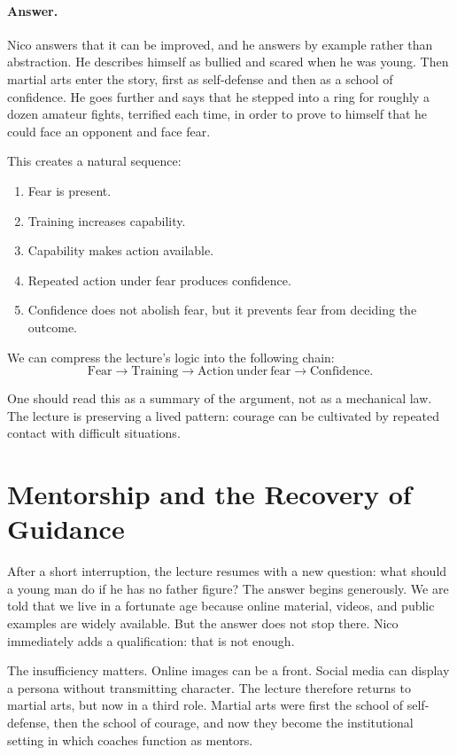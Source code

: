\paragraph{Answer.} Nico answers that it can be improved, and he answers by example rather than abstraction. He describes himself as bullied and scared when he was young. Then martial arts enter the story, first as self-defense and then as a school of confidence. He goes further and says that he stepped into a ring for roughly a dozen amateur fights, terrified each time, in order to prove to himself that he could face an opponent and face fear.

This creates a natural sequence:
\begin{enumerate}
\item Fear is present.
\item Training increases capability.
\item Capability makes action available.
\item Repeated action under fear produces confidence.
\item Confidence does not abolish fear, but it prevents fear from deciding the outcome.
\end{enumerate}

We can compress the lecture's logic into the following chain:
\begin{equation}
\mathrm{Fear}\to \mathrm{Training}\to \mathrm{Action\ under\ fear}\to \mathrm{Confidence}.
\end{equation}

One should read this as a summary of the argument, not as a mechanical law. The lecture is preserving a lived pattern: courage can be cultivated by repeated contact with difficult situations.

\section{Mentorship and the Recovery of Guidance}

After a short interruption, the lecture resumes with a new question: what should a young man do if he has no father figure? The answer begins generously. We are told that we live in a fortunate age because online material, videos, and public examples are widely available. But the answer does not stop there. Nico immediately adds a qualification: that is not enough.

The insufficiency matters. Online images can be a front. Social media can display a persona without transmitting character. The lecture therefore returns to martial arts, but now in a third role. Martial arts were first the school of self-defense, then the school of courage, and now they become the institutional setting in which coaches function as mentors.

